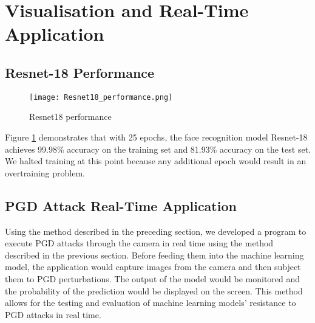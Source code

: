 \section{Visualisation and Real-Time Application}

\subsection{Resnet-18 Performance}

\begin{figure}[h]
    \centering
    \texttt{[image: Resnet18\_performance.png]}
    \caption{Resnet18 performance}
    \label{fig:resnet18_performance}
\end{figure}

Figure \ref{fig:resnet18_performance} demonstrates that with 25 epochs, the face recognition model Resnet-18 achieves 99.98\% accuracy on the training set and 81.93\% accuracy on the test set. We halted training at this point because any additional epoch would result in an overtraining problem.

\subsection{PGD Attack Real-Time Application}

Using the method described in the preceding section, we developed a program to execute PGD attacks through the camera in real time using the method described in the previous section. Before feeding them into the machine learning model, the application would capture images from the camera and then subject them to PGD perturbations. The output of the model would be monitored and the probability of the prediction would be displayed on the screen. This method allows for the testing and evaluation of machine learning models' resistance to PGD attacks in real time.



